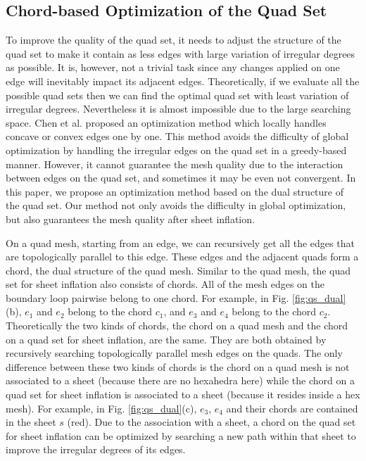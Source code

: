 \documentclass[final,5p,times,twocolumn]{elsarticle}
\begin{document}
\subsection{Chord-based Optimization of the Quad Set}
\label{sec:opt_qs_dual}
To improve the quality of the quad set, it needs to adjust the structure of the quad set to make it contain as less edges with large variation of irregular degrees as possible. It is, however, not a trivial task since any changes applied on one edge will inevitably impact its adjacent edges. Theoretically, if we evaluate all the possible quad sets then we can find the optimal quad set with least variation of irregular degrees. Nevertheless it is almost impossible due to the large searching space. Chen et al. proposed an optimization method which locally handles concave or convex edges one by one\cite{Chen:2015kf}. This method avoids the difficulty of global optimization by handling the irregular edges on the quad set in a greedy-based manner. However, it cannot guarantee the mesh quality due to the interaction between edges on the quad set, and sometimes it may be even not convergent. In this paper, we propose an optimization method based on the dual structure of the quad set. Our method not only avoids the difficulty in global optimization, but also guarantees the mesh quality after sheet inflation.

On a quad mesh, starting from an edge, we can recursively get all the edges that are topologically parallel to this edge. These edges and the adjacent quads form a chord, the dual structure of the quad mesh\cite{Murdoch:1997fy,Mitchell1996}. Similar to the quad mesh, the quad set for sheet inflation also consists of chords. All of the mesh edges on the boundary loop pairwise belong to one chord. For example, in Fig. \ref{fig:qs_dual}(b), $e_1$ and $e_2$ belong to the chord $c_1$, and $e_3$ and $e_4$ belong to the chord $c_2$. Theoretically the two kinds of chords, the chord on a quad mesh and the chord on a quad set for sheet inflation, are the same. They are both obtained by recursively searching topologically parallel mesh edges on the quads. The only difference between these two kinds of chords is the chord on a quad mesh is not associated to a sheet (because there are no hexahedra here) while the chord on a quad set for sheet inflation is associated to a sheet (because it resides inside a hex mesh). For example, in Fig. \ref{fig:qs_dual}(c), $e_3$, $e_4$ and their chords are contained in the sheet $s$ (red). Due to the association with a sheet, a chord on the quad set for sheet inflation can be optimized by searching a new path within that sheet to improve the irregular degrees of its edges.
\end{document}
